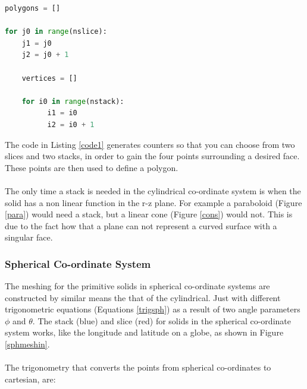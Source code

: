 \documentclass[12pt,a4paper]{article}
\begin{document}
\newpage
\begin{lstlisting}[language=Python, label=code1, caption=Basic method structure for Pyg4ometry primitive meshing of solids]
polygons = []

for j0 in range(nslice):
    j1 = j0
    j2 = j0 + 1
    
    vertices = []

    for i0 in range(nstack):
          i1 = i0
          i2 = i0 + 1     

\end{lstlisting}
The code in Listing \ref{code1} generates counters so that you can choose from two slices and two stacks, in order to gain the four points surrounding a desired face. These points are then used to define a polygon. 
\\\\
The only time a stack is needed in the cylindrical co-ordinate system is when the solid has a non linear function in the r-z plane. For example a paraboloid (Figure \ref{para}) would need a stack, but a linear cone (Figure \ref{cons}) would not. This is due to the fact how that a plane can not represent a curved surface with a singular face. 

\newpage
\subsubsection{Spherical Co-ordinate System}

The meshing for the primitive solids in spherical co-ordinate systems are constructed by similar means the that of the cylindrical. Just with different trigonometric equations (Equations \ref{trigsph}) as a result of two angle parameters $\phi$ and $\theta$. The stack (blue) and slice (red) for solids in the spherical co-ordinate system works, like the longitude and latitude on a globe, as shown in Figure \ref{sphmeshin}. 
\\\\
The trigonometry that converts the points from spherical co-ordinates to cartesian, are:
\end{document}
